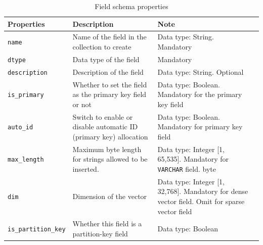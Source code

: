 \begin{table}[H]
	\centering
	\label{tab:field_schema_properties}
	\begin{tabular}{p{3cm}p{5.5cm}p{5.5cm}l}
		\hline
		\textbf{Properties}   & \textbf{Description}                                                                 & \textbf{Note}                                                                                                                                         \\ \hline
		\texttt{name}         & Name of the field in the collection to create                                        & Data type: String. Mandatory                                                                                                                         \\ \hline
		\texttt{dtype}        & Data type of the field                                                              & Mandatory                                                                                                                                             \\ \hline
		\texttt{description}  & Description of the field                                                            & Data type: String. Optional                                                                                                                          \\ \hline
		\texttt{is\_primary}  & Whether to set the field as the primary key field or not                            & Data type: Boolean. Mandatory for the primary key field                                                            \\ \hline
		\texttt{auto\_id}     & Switch to enable or disable automatic ID (primary key) allocation                   & Data type: Boolean. Mandatory for primary key field                                                                                     \\ \hline
		\texttt{max\_length}  & Maximum byte length for strings allowed to be inserted.                             & Data type: Integer {[}1, 65,535{]}. Mandatory for \texttt{VARCHAR} field. byte                                            \\ \hline
		\texttt{dim}          & Dimension of the vector                                                            & Data type: Integer {[}1, 32,768{]}. Mandatory for dense vector field. Omit for sparse vector field                                                   \\ \hline
		\texttt{is\_partition\_key} & Whether this field is a partition-key field                                      & Data type: Boolean                                                                                           \\ \hline
	\end{tabular}
	\caption{Field schema properties\protect\footnotemark}
\end{table}

